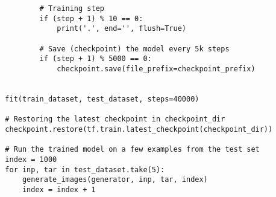 \begin{lstlisting}
          # Training step
          if (step + 1) % 10 == 0:
              print('.', end='', flush=True)

          # Save (checkpoint) the model every 5k steps
          if (step + 1) % 5000 == 0:
              checkpoint.save(file_prefix=checkpoint_prefix)


  fit(train_dataset, test_dataset, steps=40000)

  # Restoring the latest checkpoint in checkpoint_dir
  checkpoint.restore(tf.train.latest_checkpoint(checkpoint_dir))

  # Run the trained model on a few examples from the test set
  index = 1000
  for inp, tar in test_dataset.take(5):
      generate_images(generator, inp, tar, index)
      index = index + 1

\end{lstlisting}
